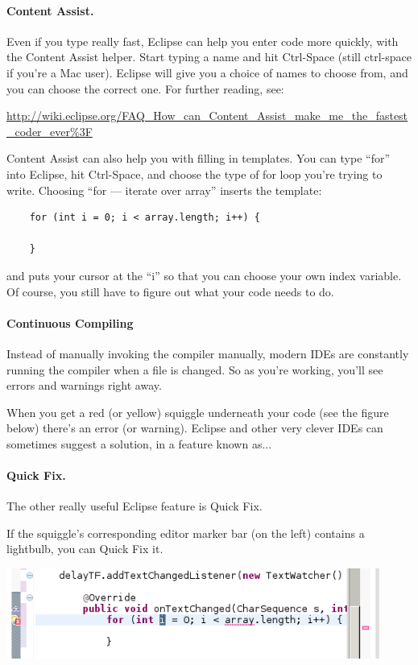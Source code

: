 \paragraph{Content Assist.} Even if you type really fast,
Eclipse can help you enter code more quickly, with the Content Assist helper.
Start typing a name and hit Ctrl-Space (still ctrl-space if you're a Mac user). Eclipse will give you a
choice of names to choose from, and you can choose the correct one.
For further reading, see:
\begin{center}\small
\url{http://wiki.eclipse.org/FAQ_How_can_Content_Assist_make_me_the_fastest_coder_ever%3F}
\end{center}
Content Assist can also help you with filling in templates.
You can type ``for'' into Eclipse, hit Ctrl-Space, and choose the 
type of for loop you're trying to write. Choosing ``for --- iterate over array''
inserts the template:
\begin{verbatim}
    for (int i = 0; i < array.length; i++) {

    }
\end{verbatim}
and puts your cursor at the ``i'' so that you can choose your own
index variable. Of course, you still have to figure out what your
code needs to do.

\paragraph{Continuous Compiling} Instead of manually invoking the compiler manually, modern IDEs are constantly running the compiler when a file is changed. So as you're working, you'll see errors and warnings right away.

When you get a red (or yellow) squiggle underneath your code (see the figure below) there's an error (or warning). Eclipse and other very clever IDEs can sometimes suggest a solution, in a feature known as...

\paragraph{Quick Fix.} The other really useful Eclipse feature is Quick Fix.

If the squiggle's corresponding editor marker bar (on the left) contains
a lightbulb, you can Quick Fix it. 

\begin{center}
\includegraphics[height=8em]{images/quickfix}
\end{center}

